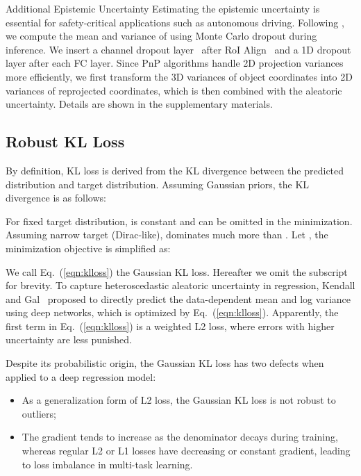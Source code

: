 \documentclass[10pt,twocolumn,letterpaper]{article}
\makeatletter
\renewcommand{\paragraph}{
  \@startsection{paragraph}{4}
  {\z@}{0.7ex \@plus .2ex \@minus .1ex}{-1em}
  {\normalfont\normalsize\bfseries}
}
\makeatother
\begin{document}
\paragraph{Additional Epistemic Uncertainty} Estimating the epistemic uncertainty is essential for safety-critical applications such as autonomous driving.
Following \cite{kendall2017uncertainties}, we compute the mean and variance of  using Monte Carlo dropout during inference. We insert a channel dropout layer~\cite{channeldropout} after RoI Align~\cite{maskrcnn} and a 1D dropout layer after each FC layer. Since PnP algorithms handle 2D projection variances more efficiently, we first transform the 3D variances of object coordinates into 2D variances of reprojected coordinates, which is then combined with the aleatoric uncertainty. Details are shown in the supplementary materials.

\subsection{Robust KL Loss} \label{rkl}
By definition, KL loss is derived from the KL divergence between the predicted distribution and target distribution. Assuming Gaussian priors, the KL divergence is as follows:

For fixed target distribution,  is constant and can be omitted in the minimization. Assuming narrow target (Dirac-like),  dominates much more than . Let , the minimization objective is simplified as:

We call Eq.~(\ref{eqn:klloss}) the Gaussian KL loss. Hereafter we omit the subscript  for brevity. To capture heteroscedastic aleatoric uncertainty in regression, Kendall and Gal~\cite{kendall2017uncertainties} proposed to directly predict the data-dependent mean  and log variance  using deep networks, which is optimized by Eq.~(\ref{eqn:klloss}). Apparently, the first term in Eq.~(\ref{eqn:klloss}) is a weighted L2 loss, where errors with higher uncertainty are less punished. 

Despite its probabilistic origin, the Gaussian KL loss has two defects when applied to a deep regression model: 
\begin{itemize}[noitemsep,topsep=0.7ex]
    \item As a generalization form of L2 loss, the Gaussian KL loss is not robust to outliers;
    \item The gradient \wrt  tends to increase as the denominator  decays during training, whereas regular L2 or L1 losses have decreasing or constant gradient, leading to loss imbalance in multi-task learning.
\end{itemize}
\end{document}
